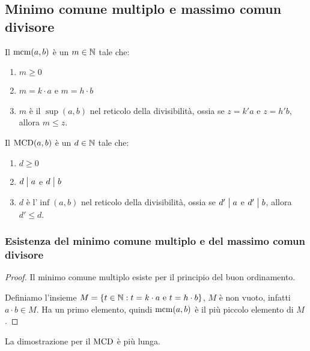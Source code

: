 \subsection{Minimo comune multiplo e massimo comun divisore}
\begin{defn}
Il $\operatorname{mcm}(a,b) $ \`e un $m \in \mathbb{N}$ tale che:
\begin{enumerate}
     \item $m \ge 0$
     \item $m = k \cdot a$ e $m = h \cdot b$
     \item $m$ \`e il $\sup(a,b)$ nel reticolo della divisibilit\`a, ossia se $z = k' a$ e $z = h' b$, allora $m \le z$.
\end{enumerate}
\end{defn}
\begin{defn}
Il $\operatorname{MCD}(a,b)$ \`e un $d \in \mathbb{N}$ tale che:
\begin{enumerate}
    \item $d \ge 0$
    \item $d \bigm| a$ e $d \bigm| b$
    \item $d$ \`e l'$\inf(a,b)$ nel reticolo della divisibilit\`a, ossia se $d' \bigm| a$ e $d' \bigm| b$, allora $d' \le d$.
\end{enumerate}
\end{defn}
\subsubsection{Esistenza del minimo comune multiplo e del massimo comun divisore}
\begin{proof}
Il minimo comune multiplo esiste per il principio del buon ordinamento.

Definiamo l'insieme $M = \{ t \in \mathbb{N} : t = k \cdot a \text{ e } t = h \cdot b \}$, $M$ \`e non vuoto, infatti $a \cdot b \in M$. Ha un primo elemento, quindi $\operatorname{mcm}(a,b)$ \`e il pi\`u piccolo elemento di $M$.
\end{proof}
La dimostrazione per il $\operatorname{MCD}$ \`e pi\`u lunga.

